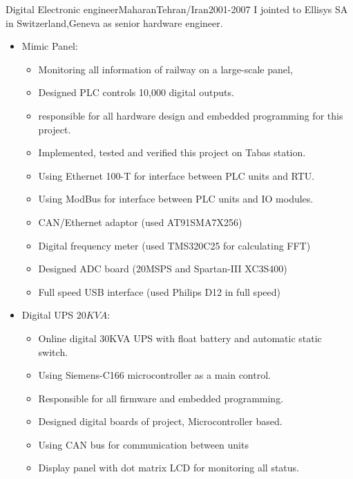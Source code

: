 \documentclass[10pt, a4paper]{article}
\begin{document}
\begin{cvitem}{Digital Electronic engineer}{Maharan}{Tehran/Iran}{2001-2007}
    I jointed to Ellisys SA in Switzerland,Geneva as senior hardware engineer.
    \begin{itemize}
        \item Mimic Panel:
        \begin{itemize} 
            \item Monitoring all information of railway on a large-scale panel,
            \item Designed PLC controls 10,000 digital outputs.
            \item responsible for all hardware design and embedded programming for this project.
            \item Implemented, tested and verified this project on Tabas station.
            \item Using Ethernet 100-T for interface between PLC units and RTU.
            \item Using ModBus for interface between PLC units and IO modules.
            \item CAN/Ethernet adaptor (used AT91SMA7X256)
            \item Digital frequency meter (used TMS320C25 for calculating FFT)
            \item Designed ADC board (20MSPS and Spartan-III XC3S400)
            \item Full speed USB interface (used Philips D12 in full speed)
        \end{itemize}
        \item Digital UPS \(20KVA\):
        \begin{itemize}
            \item Online digital 30KVA UPS with float battery and automatic static switch.
            \item Using Siemens-C166 microcontroller as a main control.
            \item Responsible for all firmware and embedded programming.
            \item Designed digital boards of project, Microcontroller based.
            \item Using CAN bus for communication between units
            \item Display panel with dot matrix LCD for monitoring all status.
        \end{itemize}
    \end{itemize}
\end{cvitem}
\end{document}
